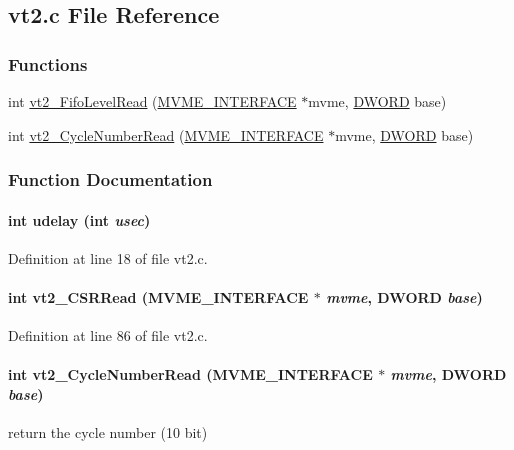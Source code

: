 \subsection{vt2.c File Reference}
\label{vt2_8c}
\subsubsection*{Functions}
\begin{DoxyCompactItemize}
\item 
int \hyperlink{vt2_8c_ae99f1221836d1b970dc145ad8b0e53b7}{vt2\_\-FifoLevelRead} (\hyperlink{structMVME__INTERFACE}{MVME\_\-INTERFACE} $\ast$mvme, \hyperlink{vt2_8h_a798af1e30bc65f319c1a246cecf59e39}{DWORD} base)
\item 
int \hyperlink{vt2_8c_abaf463023a19b2793a39227b5315c6cc}{vt2\_\-CycleNumberRead} (\hyperlink{structMVME__INTERFACE}{MVME\_\-INTERFACE} $\ast$mvme, \hyperlink{vt2_8h_a798af1e30bc65f319c1a246cecf59e39}{DWORD} base)
\end{DoxyCompactItemize}


\subsubsection{Function Documentation}
\paragraph[{udelay}]{\setlength{\rightskip}{0pt plus 5cm}int udelay (int {\em usec})}\hfill\label{vt2_8c_aeaa5c434da81fbdf4a665b67f66592bc}


Definition at line 18 of file vt2.c.
\paragraph[{vt2\_\-CSRRead}]{\setlength{\rightskip}{0pt plus 5cm}int vt2\_\-CSRRead ({\bf MVME\_\-INTERFACE} $\ast$ {\em mvme}, \/  {\bf DWORD} {\em base})}\hfill\label{vt2_8c_a6bea5bc4347f5e5b0623af8c361a68e8}


Definition at line 86 of file vt2.c.
\paragraph[{vt2\_\-CycleNumberRead}]{\setlength{\rightskip}{0pt plus 5cm}int vt2\_\-CycleNumberRead ({\bf MVME\_\-INTERFACE} $\ast$ {\em mvme}, \/  {\bf DWORD} {\em base})}\hfill\label{vt2_8c_abaf463023a19b2793a39227b5315c6cc}
return the cycle number (10 bit) 

